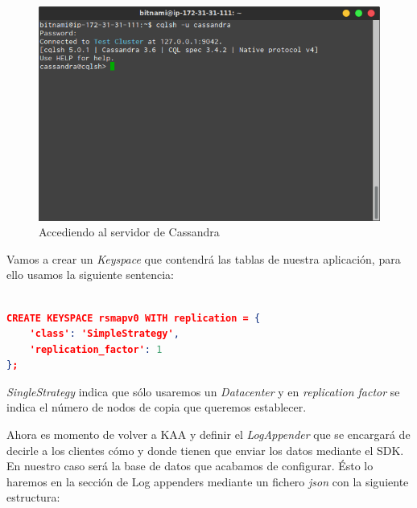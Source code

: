 \begin{figure}[!ht]
  \begin{center}
    \includegraphics[scale=0.55]{../images/cassandra/3.png}
		\caption{Accediendo al servidor de Cassandra}
    \label{fig:kaa}
	\end{center}
\end{figure}

\newpage

Vamos a crear un \textit{Keyspace} que contendrá las tablas de nuestra aplicación, para ello usamos la siguiente sentencia:

\begin{lstlisting}[language=json,caption={Keyspace en Cassandra},label={lst:json_personal}]

CREATE KEYSPACE rsmapv0 WITH replication = {
	'class': 'SimpleStrategy',
	'replication_factor': 1
};

\end{lstlisting}

\textit{SingleStrategy} indica que sólo usaremos un \textit{Datacenter} y en \textit{replication factor} se indica el número de nodos de copia que queremos establecer.

\newpage

Ahora es momento de volver a KAA y definir el \textit{LogAppender} que se encargará de decirle a los clientes cómo y donde tienen que enviar los datos mediante el SDK. En nuestro caso será la base de datos que acabamos de configurar. Ésto lo haremos en la sección de Log appenders mediante un fichero \textit{json} con la siguiente estructura:


